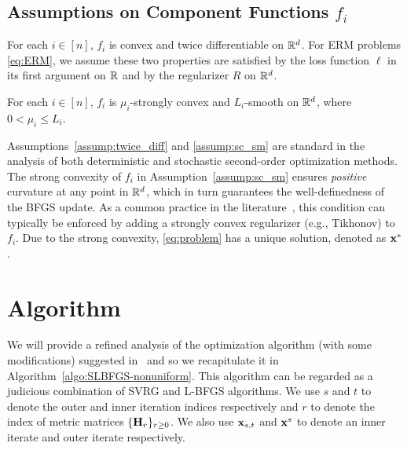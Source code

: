 \documentclass[10pt,twocolumn,journal]{IEEEtran}
\begin{document}
\subsection{Assumptions on Component Functions $f_i$}
\begin{assump}\label{assump:twice_diff}
For each $i\in[n]$, $f_i$ is convex and twice differentiable on $\mathbb{R}^d$. For ERM problems \eqref{eq:ERM}, we assume these two properties are satisfied by the loss function $\ell$ in its first argument on $\mathbb{R}$ and by the regularizer $R$ on $\mathbb{R}^d$. 
\end{assump}

\begin{assump}\label{assump:sc_sm}
For each $i\in[n]$, $f_i$ is $\mu_i$-strongly convex and $L_i$-smooth on $\mathbb{R}^d$, where $0<\mu_i\le L_i$. 
\end{assump}

\begin{remark}
Assumptions~\ref{assump:twice_diff} and \ref{assump:sc_sm} {are standard}   in the analysis of both deterministic and stochastic  second-order optimization methods. %
 The strong convexity of $f_i$ in Assumption~\ref{assump:sc_sm} ensures {\em positive} curvature at any point in $\mathbb{R}^d$, which in turn guarantees the well-definedness of the BFGS update. As a common practice in the literature~\cite{Byrd_16a,Moritz_16}, this condition can typically be enforced by adding a strongly convex regularizer (e.g., Tikhonov) to $f_i$. %
Due to the strong convexity, \eqref{eq:problem} has a unique solution, denoted as $\mathbf{x}^*$.
\end{remark}


\section{Algorithm}\label{sec:algo}



We will provide a refined analysis of the optimization algorithm (with some modifications) suggested in~\cite{Moritz_16} and so we recapitulate  it in 
Algorithm~\ref{algo:SLBFGS-nonuniform}. %
This algorithm can be regarded as a judicious combination of SVRG and L-BFGS algorithms. 
 We use $s$  and $t$ to denote  the outer and inner iteration indices respectively and $r$ to denote the index of {metric matrices} $\{\mathbf{H}_r\}_{r\ge 0}$. %
We also use $\mathbf{x}_{s,t}$ and $\mathbf{x}^s$ to denote an inner iterate and outer iterate respectively.   
\end{document}

